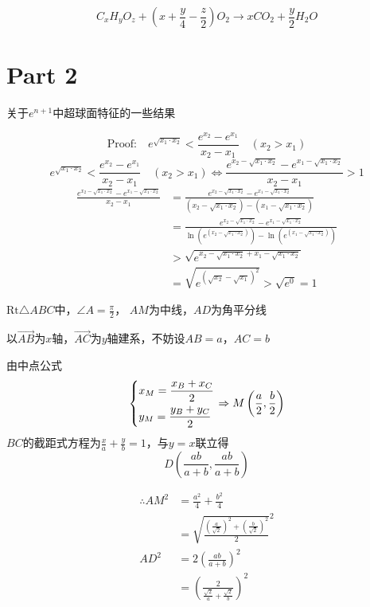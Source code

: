 \documentclass[UTF8]{article}
\begin{document}
$$
{C_xH_yO_z +(x +\frac y4-\frac z2)O_2\rightarrow xCO_2+\frac y2H_2O}
$$


\section{Part 2}
关于$e^{n+1}$中超球面特征的一些结果 \cite{Wen}

$$
\text{Proof:}\quad{e^{\sqrt {{x_1} \cdot {x_2}} }} < \frac{{{e^{{x_2}}} - {e^{{x_1}}}}}{{{x_2} - {x_1}}}
\quad({x_2} > {x_1})$$
$$
{e^{\sqrt {{x_1} \cdot {x_2}} }} < \frac{{{e^{{x_2}}} - {e^{{x_1}}}}}{{{x_2} - {x_1}}}
\quad({x_2} > {x_1})
\Leftrightarrow 
\frac{{{e^{{x_2} - \sqrt {{x_1} \cdot {x_2}} }} - {e^{{x_1} - \sqrt {{x_1} \cdot {x_2}} }}}}{{{x_2} - {x_1}}} > 1
$$
$$\begin{aligned}
\frac{{{e^{{x_2} - \sqrt {{x_1} \cdot {x_2}} }} - {e^{{x_1} - \sqrt {{x_1} \cdot {x_2}} }}}}{{{x_2} - {x_1}}}&=\frac{{{e^{{x_2} - \sqrt {{x_1} \cdot {x_2}} }} - {e^{{x_1} - \sqrt {{x_1} \cdot {x_2}} }}}}{{({x_2} - \sqrt {{x_1} \cdot {x_2}} ) - ({x_1} - \sqrt {{x_1} \cdot {x_2}} )}}\\
&=\frac{{{e^{{x_2} - \sqrt {{x_1} \cdot {x_2}} }} - {e^{{x_1} - \sqrt {{x_1} \cdot {x_2}} }}}}{{\ln ({e^{({x_2} - \sqrt {{x_1} \cdot {x_2}} )}}) - \ln ({e^{({x_1} - \sqrt {{x_1} \cdot {x_2}} )}})}}\\
&>\sqrt {{e^{{x_2} - \sqrt {{x_1} \cdot {x_2}}  + {x_1} - \sqrt {{x_1} \cdot {x_2}} }}}\\
&=\sqrt {{e^{{{(\sqrt {{x_2}}  - \sqrt {{x_1}} )}^2}}}}>\sqrt {e^0}=1
\end{aligned}
$$

$\text{Rt}\triangle ABC$中，$\angle A=\frac\pi2$， $AM$为中线，$AD$为角平分线

以$\vec{AB}$为$x$轴，$\vec{AC}$为$y$轴建系，不妨设$AB=a$，$AC=b$

由中点公式
$$
\left\{ \begin{gathered}
  {x_M} = \frac{{{x_B} + {x_C}}}{2} \hfill \\
  {y_M} = \frac{{{y_B} + {y_C}}}{2} \hfill \\\end{gathered}  \right.\Rightarrow M\left( {\frac{a}{2},\frac{b}{2}} \right)
$$
$ BC$的截距式方程为$\frac{x}{a} + \frac{y}{b} = 1$，与$y=x$联立得
$$
D\left( {\frac{{ab}}{{a + b}},\frac{{ab}}{{a + b}}} \right)
$$

$$
\begin{align}
\therefore A{M^2} &= \frac{{{a^2}}}{4} + \frac{{{b^2}}}{4}\\
	&={\sqrt {\frac{{{{\left( {\frac{a}{{\sqrt 2 }}} \right)}^2} + {{\left( {\frac{b}{{\sqrt 2 }}} \right)}^2}}}{2}} ^2}
\\AD^2&=2{\left( {\frac{{ab}}{{a + b}}} \right)^2}\\
&= {\left( {\frac{2}{{\frac{{\sqrt 2 }}{a} + \frac{{\sqrt 2 }}{b}}}} \right)^2}
\end{align}
$$
\end{document}
